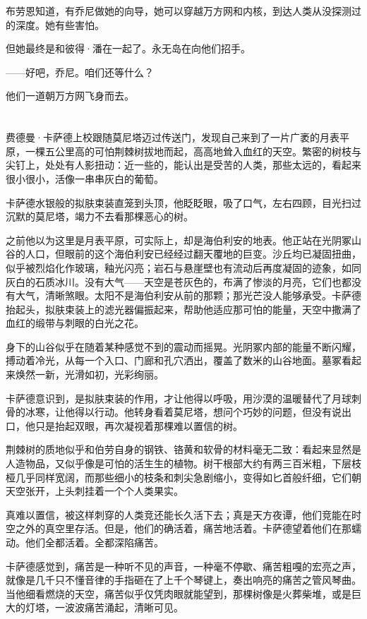 \documentclass[AutoFakeBold=true]{book}
\begin{document}
布劳恩知道，有乔尼做她的向导，她可以穿越万方网和内核，到达人类从没探测过的深度。她有些害怕。

但她最终是和彼得·潘在一起了。永无岛在向他们招手。

{\kaishu ——好吧，乔尼。咱们还等什么？}

他们一道朝万方网飞身而去。

\chapter{}

费德曼·卡萨德上校跟随莫尼塔迈过传送门，发现自己来到了一片广袤的月表平原，一棵五公里高的可怕荆棘树拔地而起，高高地耸入血红的天空。繁密的树枝与尖钉上，处处有人影扭动：近一些的，能认出是受苦的人类，那些太远的，看起来很小很小，活像一串串灰白的葡萄。

卡萨德水银般的拟肤束装直笼到头顶，他眨眨眼，吸了口气，左右四顾，目光扫过沉默的莫尼塔，竭力不去看那棵恶心的树。

之前他以为这里是月表平原，可实际上，却是海伯利安的地表。他正站在光阴冢山谷的人口，但眼前的这个海伯利安已经经过翻天覆地的巨变。沙丘均已凝固扭曲，似乎被烈焰化作玻璃，釉光闪亮；岩石与悬崖壁也有流动后再度凝固的迹象，如同灰白的石质冰川。没有大气——天空是苍灰色的，布满了惨淡的月亮，它们也都没有大气，清晰煞眼。太阳不是海伯利安从前的那颗；那光芒没人能够承受。卡萨德抬起头，拟肤束装上的滤光器偏振起来，帮助他适应那可怕的能量，天空中撒满了血红的缎带与刺眼的白光之花。

身下的山谷似乎在随着某种感觉不到的震动而摇晃。光阴冢内部的能量不断闪耀，搏动着冷光，从每一个入口、门廊和孔穴洒出，覆盖了数米的山谷地面。墓冢看起来焕然一新，光滑如初，光彩绚丽。

卡萨德意识到，是拟肤束装的作用，才让他得以呼吸，用沙漠的温暖替代了月球刺骨的冰寒，让他得以行动。他转身看着莫尼塔，想问个巧妙的问题，但没有说出口，他只是抬起双眼，再次凝视着那棵难以置信的树。

荆棘树的质地似乎和伯劳自身的钢铁、铬黄和软骨的材料毫无二致：看起来显然是人造物品，又似乎像是可怕的活生生的植物。树干根部大约有两三百米粗，下层枝桠几乎同样宽阔，而那些细小的枝条和刺尖急剧缩小，变得如匕首般纤细，它们朝天空张开，上头刺挂着一个个人类果实。

真难以置信，被这样刺穿的人类竞还能长久活下去；真是天方夜谭，他们竞能在时空之外的真空里存活。但是，他们的确活着，痛苦地活着。卡萨德望着他们在那蠕动。他们全都活着。全都深陷痛苦。

卡萨德感觉到，痛苦是一种听不见的声音，一种毫不停歇、痛苦粗嘎的宏亮之声，就像是几千只不懂音律的手指砸在了上千个琴键上，奏出响亮的痛苦之管风琴曲。当他细看燃烧的天空，痛苦似乎仅凭肉眼就能望到，那棵树像是火葬柴堆，或是巨大的灯塔，一波波痛苦涌起，清晰可见。
\end{document}

